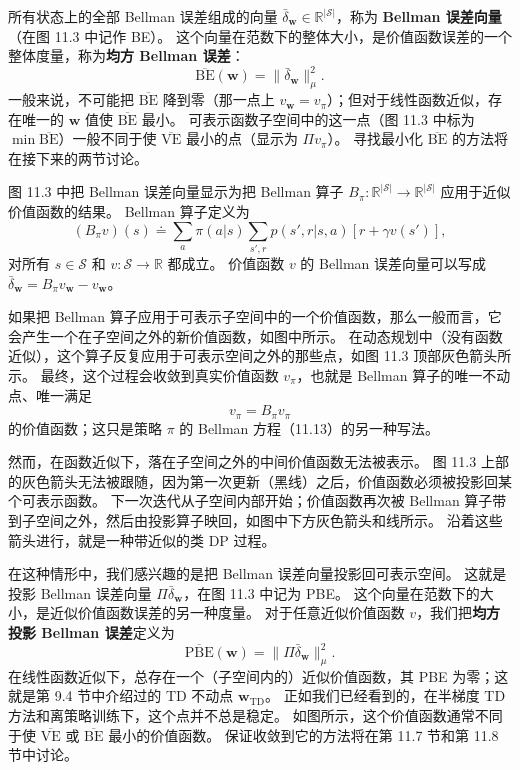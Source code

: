 \documentclass[UTF8, 12pt, fontset=fandol, oneside]{ctexart}
\begin{document}
所有状态上的全部 Bellman 误差组成的向量 $\bar\delta_{\mathbf{w}}\in\mathbb{R}^{|\mathcal{S}|}$，称为 \textbf{Bellman 误差向量}（在图 11.3 中记作 BE）。
这个向量在范数下的整体大小，是价值函数误差的一个整体度量，称为\textbf{均方 Bellman 误差}：
\begin{equation}
\overline{\mathrm{BE}}(\mathbf{w})=\|\bar\delta_{\mathbf{w}}\|_\mu^2.
\tag{11.19}
\end{equation}
一般来说，不可能把 $\overline{\mathrm{BE}}$ 降到零（那一点上 $v_{\mathbf{w}}=v_\pi$）；但对于线性函数近似，存在唯一的 $\mathbf{w}$ 值使 $\overline{\mathrm{BE}}$ 最小。
可表示函数子空间中的这一点（图 11.3 中标为 $\min\overline{\mathrm{BE}}$）一般不同于使 $\overline{\mathrm{VE}}$ 最小的点（显示为 $\Pi v_\pi$）。
寻找最小化 $\overline{\mathrm{BE}}$ 的方法将在接下来的两节讨论。

图 11.3 中把 Bellman 误差向量显示为把 Bellman 算子
$B_\pi:\mathbb{R}^{|\mathcal{S}|}\to\mathbb{R}^{|\mathcal{S}|}$ 应用于近似价值函数的结果。
Bellman 算子定义为
\begin{equation}
(B_\pi v)(s)\doteq \sum_a\pi(a|s)\sum_{s',r}p(s',r|s,a)\left[r+\gamma v(s')\right],
\tag{11.20}
\end{equation}
对所有 $s\in\mathcal{S}$ 和 $v:\mathcal{S}\to\mathbb{R}$ 都成立。
价值函数 $v$ 的 Bellman 误差向量可以写成
$\bar\delta_{\mathbf{w}}=B_\pi v_{\mathbf{w}}-v_{\mathbf{w}}$。

如果把 Bellman 算子应用于可表示子空间中的一个价值函数，那么一般而言，它会产生一个在子空间之外的新价值函数，如图中所示。
在动态规划中（没有函数近似），这个算子反复应用于可表示空间之外的那些点，如图 11.3 顶部灰色箭头所示。
最终，这个过程会收敛到真实价值函数 $v_\pi$，也就是 Bellman 算子的唯一不动点、唯一满足
\begin{equation}
v_\pi=B_\pi v_\pi
\tag{11.21}
\end{equation}
的价值函数；这只是策略 $\pi$ 的 Bellman 方程（11.13）的另一种写法。

然而，在函数近似下，落在子空间之外的中间价值函数无法被表示。
图 11.3 上部的灰色箭头无法被跟随，因为第一次更新（黑线）之后，价值函数必须被投影回某个可表示函数。
下一次迭代从子空间内部开始；价值函数再次被 Bellman 算子带到子空间之外，然后由投影算子映回，如图中下方灰色箭头和线所示。
沿着这些箭头进行，就是一种带近似的类 DP 过程。

在这种情形中，我们感兴趣的是把 Bellman 误差向量投影回可表示空间。
这就是投影 Bellman 误差向量 $\Pi\bar\delta_{\mathbf{w}}$，在图 11.3 中记为 PBE。
这个向量在范数下的大小，是近似价值函数误差的另一种度量。
对于任意近似价值函数 $v$，我们把\textbf{均方投影 Bellman 误差}定义为
\begin{equation}
\overline{\mathrm{PBE}}(\mathbf{w})=\|\Pi\bar\delta_{\mathbf{w}}\|_\mu^2.
\tag{11.22}
\end{equation}
在线性函数近似下，总存在一个（子空间内的）近似价值函数，其 PBE 为零；这就是第 9.4 节中介绍过的 TD 不动点 $\mathbf{w}_{\mathrm{TD}}$。
正如我们已经看到的，在半梯度 TD 方法和离策略训练下，这个点并不总是稳定。
如图所示，这个价值函数通常不同于使 $\overline{\mathrm{VE}}$ 或 $\overline{\mathrm{BE}}$ 最小的价值函数。
保证收敛到它的方法将在第 11.7 节和第 11.8 节中讨论。
\end{document}
